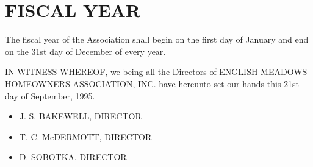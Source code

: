 \documentclass[12pt, letterpaper]{article}
\begin{document}
\section{FISCAL YEAR}
The fiscal year of the Association shall begin on the first day of January and end on the 31st day of December of every year.

IN WITNESS WHEREOF, we being all the Directors of ENGLISH MEADOWS HOMEOWNERS ASSOCIATION, INC. have hereunto set our hands this 21st day of September, 1995.
\begin{itemize}
 \item J. S. BAKEWELL, DIRECTOR
 \item T. C. McDERMOTT, DIRECTOR
 \item D. SOBOTKA, DIRECTOR
\end{itemize}
\end{document}
